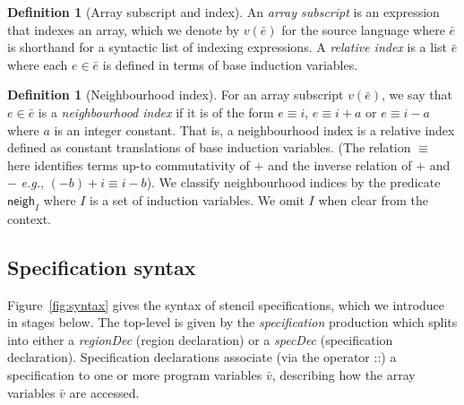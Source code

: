 \documentclass[9pt,preprint]{sigplanconf}
\newcounter{block}
\theoremstyle{definition}
\newtheorem{definition}[block]{Definition}
\newcommand{\eg}{\emph{e.g.}}
\newcommand{\nonterm}[1]{\textit{#1}}
\newcommand{\neigh}{\textsf{neigh}}
\begin{document}
\begin{definition}[Array subscript and index]
  An \emph{array subscript} is an expression that indexes an array, which we denote
  by $v(\bar{e})$ for the source language where $\bar{e}$ is shorthand
  for a syntactic list of indexing expressions. A \emph{relative
    index} is a list $\bar{e}$ where each $e \in \bar{e}$ is defined
  in terms of base induction variables.
\end{definition}

\begin{definition}[Neighbourhood index]
  For an array subscript $v(\bar{e})$, we say that $e \in \bar{e}$
  is a \emph{neighbourhood index} if it is of the form
  $e \equiv i$, $e \equiv i + a$ or $e \equiv i - a$ where $a$ is an
  integer constant. That is, a neighbourhood index is a
  relative index defined as constant translations of base induction
  variables. (The relation $\equiv$ here identifies terms up-to commutativity
  of $+$ and the inverse relation of $+$ and $-$ \eg{},
  $(-b) + i \equiv i - b$).  We classify neighbourhood indices 
  by the predicate $\neigh_I$ where $I$ is a set of induction
  variables. We omit $I$ when clear from the context.
\label{def:neighbour}
\end{definition}

\subsection{Specification syntax}
\label{sec:syntax}

Figure~\ref{fig:syntax} gives the syntax of stencil specifications,
which we introduce in stages below.  The top-level is given by the
\nonterm{specification} production which splits into either a
\nonterm{regionDec} (region declaration) or a \nonterm{specDec}
(specification declaration). Specification declarations associate
(via the operator $\texttt{::}$) a specification to one or more program variables
$\bar{v}$, describing how the array variables $\bar{v}$ are accessed.

\end{document}
